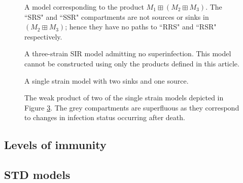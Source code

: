 \begin{figure}
    \centering
    
    \caption{A model corresponding to the product $M_1\boxplus (M_2\boxplus M_3)$. The ``SRS" and ``SSR" compartments are not sources or sinks in $(M_2 \boxplus M_3)$; hence they have no paths to ``RRS" and ``RSR" respectively.}
    \label{fig:wp_nonasoc}
\end{figure}

\begin{figure}
    \centering
    
    \caption{A three-strain SIR model admitting no superinfection. This model cannot be constructed using only the products defined in this article.}
    \label{fig:ms_ns_3d}
\end{figure}

\begin{figure}
    \centering
    
    \caption{A single strain model with two sinks and one source.}
    \label{fig:msms}
\end{figure}

\begin{figure}
    \centering
    
    \caption{The weak product of two of the single strain models depicted in Figure \ref{fig:msms}. The grey compartments are superfluous as they correspond to changes in infection status occurring after death.}
    \label{fig:msms2}
\end{figure}

\FloatBarrier

\subsection{Levels of immunity}\label{immunity}

\subsection{STD models}\label{std}


